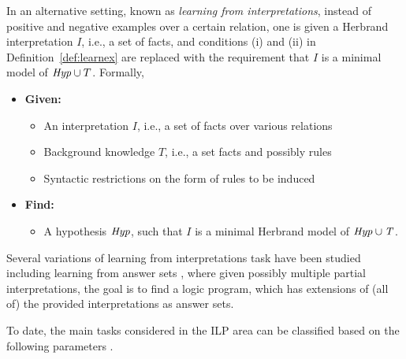 In an alternative setting, known as \emph{learning from interpretations}, instead of positive and negative examples over a certain relation, one is given a Herbrand interpretation $I$, i.e., a set of facts, and conditions (i) and (ii) in Definition~\ref{def:learnex} are replaced with the requirement that $I$ is a minimal model of $\mathit{Hyp} \cup T$.
Formally, 
\begin{definition}\label{def:learnint}
\begin{itemize}
\item[] \textbf{Given:}
\begin{itemize}
\item An interpretation $I$, i.e., a set of facts over various relations
\item Background knowledge $T$, i.e., a set facts and possibly rules
\item Syntactic restrictions on the form of rules to be induced
\end{itemize}
\smallskip

\item[] \textbf{Find:}
\begin{itemize}
\item A hypothesis $\mathit{Hyp}$, such that $I$ is a minimal Herbrand model of $\mathit{Hyp \cup T}$.
\end{itemize}
\end{itemize}
\end{definition}

Several variations of learning from interpretations task have been studied including learning from answer sets \cite{DBLP:journals/tocl/Sakama05,ILASP_system,complexilasp}, where given possibly multiple partial interpretations, the goal is to find a logic program, which has extensions of (all of) the provided interpretations as answer sets.

To date, the main tasks considered in the ILP area can be classified based on the following parameters \cite{DBLP:conf/semweb/SazonauS17,Boytcheva2007OverviewOI}.



